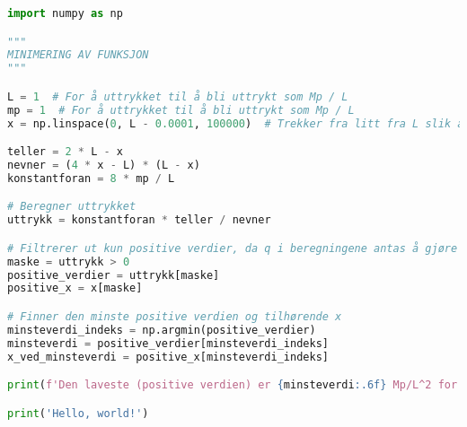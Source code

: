 \begin{lstlisting}[language=Python, caption={Pythonkode, minimering}]
import numpy as np

"""
MINIMERING AV FUNKSJON
"""

L = 1  # For å uttrykket til å bli uttrykt som Mp / L
mp = 1  # For å uttrykket til å bli uttrykt som Mp / L
x = np.linspace(0, L - 0.0001, 100000)  # Trekker fra litt fra L slik at man ikke deler på 0 når x = L

teller = 2 * L - x
nevner = (4 * x - L) * (L - x)
konstantforan = 8 * mp / L

# Beregner uttrykket
uttrykk = konstantforan * teller / nevner

# Filtrerer ut kun positive verdier, da q i beregningene antas å gjøre positivt arbeid
maske = uttrykk > 0
positive_verdier = uttrykk[maske]
positive_x = x[maske]

# Finner den minste positive verdien og tilhørende x
minsteverdi_indeks = np.argmin(positive_verdier)
minsteverdi = positive_verdier[minsteverdi_indeks]
x_ved_minsteverdi = positive_x[minsteverdi_indeks]

print(f'Den laveste (positive verdien) er {minsteverdi:.6f} Mp/L^2 for x = {x_ved_minsteverdi:.6f} L')

print('Hello, world!')

\end{lstlisting}